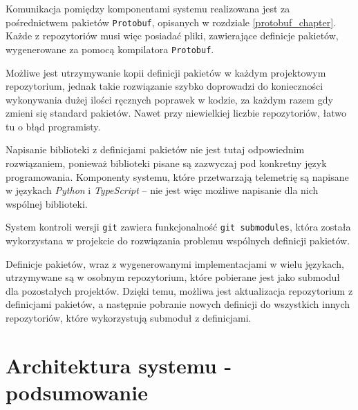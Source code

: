 Komunikacja pomiędzy komponentami systemu realizowana jest za pośrednictwem
pakietów \texttt{Protobuf}, opisanych w rozdziale \ref{protobuf_chapter}.
Każde z repozytoriów musi więc posiadać pliki, zawierające definicje pakietów,
wygenerowane za pomocą kompilatora \texttt{Protobuf}. 

Możliwe jest utrzymywanie kopii definicji pakietów w każdym projektowym repozytorium,
jednak takie rozwiązanie szybko doprowadzi do konieczności wykonywania dużej ilości
ręcznych poprawek w kodzie, za każdym razem gdy zmieni się standard pakietów. 
Nawet przy niewielkiej liczbie repozytoriów, łatwo tu o błąd programisty. 

Napisanie biblioteki z definicjami pakietów nie jest tutaj odpowiednim rozwiązaniem, 
ponieważ biblioteki pisane są zazwyczaj pod konkretny język programowania. Komponenty
systemu, które przetwarzają telemetrię są napisane w językach \textit{Python} i 
\textit{TypeScript} -- nie jest więc możliwe napisanie dla nich wspólnej biblioteki.

System kontroli wersji \texttt{git} zawiera funkcjonalność
\texttt{git submodules}\cite{git_submodules}, która została wykorzystana
w projekcie do rozwiązania problemu wspólnych definicji pakietów.

Definicje pakietów, wraz z wygenerowanymi implementacjami w wielu językach, utrzymywane 
są w osobnym repozytorium, które pobierane jest jako submoduł dla pozostałych projektów.
Dzięki temu, możliwa jest aktualizacja repozytorium z definicjami pakietów, a następnie
pobranie nowych definicji do wszystkich innych  repozytoriów, które wykorzystują
submoduł z definicjami. 



\section{Architektura systemu - podsumowanie}

